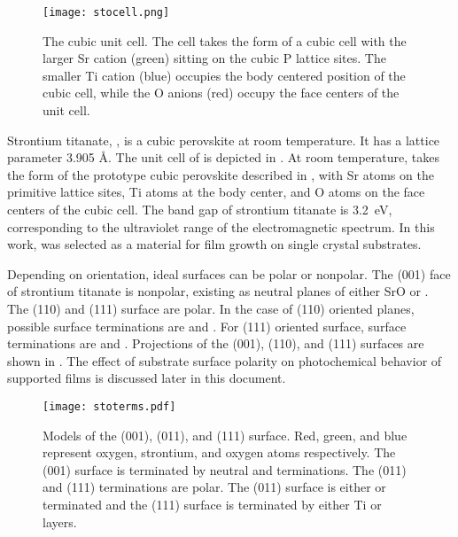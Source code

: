 \begin{figure}
\begin{center}
\texttt{[image: stocell.png]}
\caption[Cubic  unit cell]{%
	The cubic  unit cell. The cell takes the form of a 
	cubic cell with the larger Sr cation (green) sitting on the 
	cubic P lattice sites. The smaller Ti cation (blue) occupies 
	the body centered position of the cubic cell, while the O anions 
	(red) occupy the face centers of the unit cell.}
\label{fig:stocell}
\end{center}
\end{figure}

Strontium titanate, , is a cubic perovskite at room temperature. It has a
lattice parameter 3.905 \si{\angstrom}. The unit cell of  is depicted in
. At room temperature,  takes the form of the prototype
cubic perovskite described in , with Sr atoms on
the primitive lattice sites, Ti atoms at the body center, and O atoms on the face centers
of the cubic cell. The band gap of strontium titanate is 3.2~eV,\cite{Cardona:1965vw}
corresponding to the ultraviolet range of the electromagnetic spectrum. In this work,
 was selected as a material for  film growth on single crystal
substrates. 
 
Depending on orientation, ideal  surfaces can be polar or nonpolar. The (001)
face of strontium titanate is nonpolar, existing as neutral planes of either SrO or
. The (110) and (111) surface are polar. In the case of (110) oriented planes,
possible surface terminations are  and . For (111) oriented
surface, surface terminations are  and . Projections of the
(001), (110), and (111) surfaces are shown in . The effect of
substrate surface polarity on photochemical behavior of supported films is discussed later
in this document.

\begin{figure}
	\texttt{[image: stoterms.pdf]}
		\caption[Low-index  surface terminations]{%
			Models of the  (001), (011), and (111) surface. 
			Red, green, and blue represent oxygen, strontium, and oxygen 
			atoms respectively. The (001) surface is terminated by neutral 
			 and  terminations. The (011) and (111) 
			terminations are polar. The (011) surface is either  
			or  terminated and the (111) surface is terminated by 
			either Ti or  layers.}
	\label{fig:stoterms}
\end{figure}

